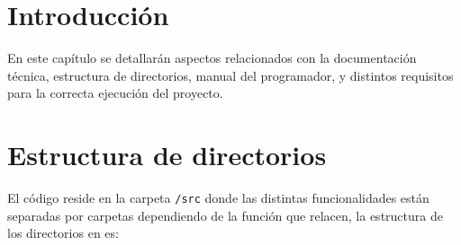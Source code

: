 
\section{Introducción}
En este capítulo se detallarán aspectos relacionados con la documentación técnica, estructura de directorios, manual del programador, y distintos requisitos para la correcta ejecución del proyecto.

\section{Estructura de directorios}
El código reside en la carpeta \texttt{/src} donde las distintas funcionalidades están separadas por carpetas dependiendo de la función que relacen, la estructura de los directorios en es:

